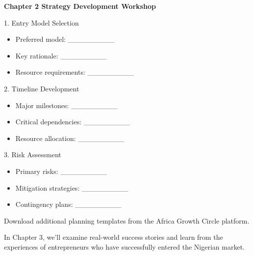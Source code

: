 \begin{workshopbox}
\textbf{Chapter 2 Strategy Development Workshop}

1. Entry Model Selection
\begin{itemize}
    \item Preferred model: \_\_\_\_\_\_\_\_\_
    \item Key rationale: \_\_\_\_\_\_\_\_\_
    \item Resource requirements: \_\_\_\_\_\_\_\_\_
\end{itemize}

2. Timeline Development
\begin{itemize}
    \item Major milestones: \_\_\_\_\_\_\_\_\_
    \item Critical dependencies: \_\_\_\_\_\_\_\_\_
    \item Resource allocation: \_\_\_\_\_\_\_\_\_
\end{itemize}

3. Risk Assessment
\begin{itemize}
    \item Primary risks: \_\_\_\_\_\_\_\_\_
    \item Mitigation strategies: \_\_\_\_\_\_\_\_\_
    \item Contingency plans: \_\_\_\_\_\_\_\_\_
\end{itemize}

Download additional planning templates from the Africa Growth Circle platform.
\end{workshopbox}

\begin{importantbox}
In Chapter 3, we'll examine real-world success stories and learn from the experiences of entrepreneurs who have successfully entered the Nigerian market.
\end{importantbox}